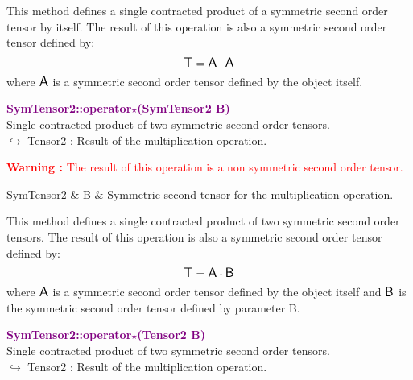 This method defines a single contracted product of a symmetric second order tensor by itself.
The result of this operation is also a symmetric second order tensor defined by:
\begin{equation*}
\mbox{\large\ensuremath{\mathsf{T}}} = \mbox{\large\ensuremath{\mathsf{A}}} \cdot \mbox{\large\ensuremath{\mathsf{A}}}
\end{equation*}
where $\mbox{\large\ensuremath{\mathsf{A}}}$ is a symmetric second order tensor defined by the object itself.

\textcolor{purple}{\textbf{SymTensor2::operator$\star$(SymTensor2 B)}}\label{SymTensor2::operator*(SymTensor2 B)}\\
Single contracted product of two symmetric second order tensors.\\ \hspace*{10mm}$\hookrightarrow$ Tensor2 : Result of the multiplication operation.

\hspace*{10mm}\textcolor{red}{\textbf{Warning :}  The result of this operation is a non symmetric second order tensor.}

\begin{tcolorbox}[width=\textwidth,myArgs,tabularx={ll|R}]
SymTensor2 & B & Symmetric second tensor for the multiplication operation.
\end{tcolorbox}

This method defines a single contracted product of two symmetric second order tensors.
The result of this operation is also a symmetric second order tensor defined by:
\begin{equation*}
\mbox{\large\ensuremath{\mathsf{T}}} = \mbox{\large\ensuremath{\mathsf{A}}} \cdot \mbox{\large\ensuremath{\mathsf{B}}}
\end{equation*}
where $\mbox{\large\ensuremath{\mathsf{A}}}$ is a symmetric second order tensor defined by the object itself and $\mbox{\large\ensuremath{\mathsf{B}}}$ is the symmetric second order tensor defined by parameter B.

\textcolor{purple}{\textbf{SymTensor2::operator$\star$(Tensor2 B)}}\label{SymTensor2::operator*(Tensor2 B)}\\
Single contracted product of two symmetric second order tensors.\\ \hspace*{10mm}$\hookrightarrow$ Tensor2 : Result of the multiplication operation.

